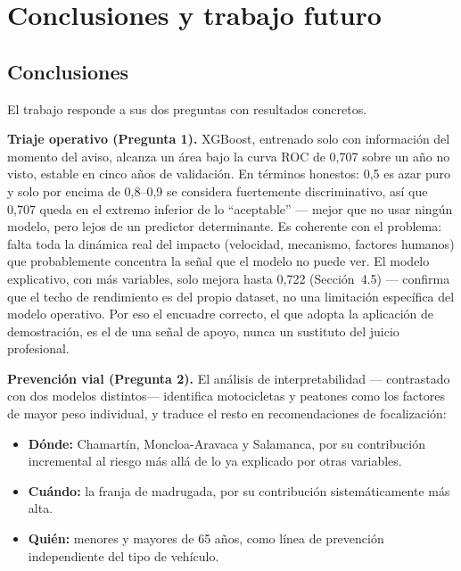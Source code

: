 \documentclass[11pt,a4paper]{article}
\begin{document}
\section{Conclusiones y trabajo futuro}

\subsection{Conclusiones}

El trabajo responde a sus dos preguntas con resultados concretos.

\textbf{Triaje operativo (Pregunta 1).} XGBoost, entrenado solo con información del momento del aviso, alcanza un área bajo la curva ROC de 0,707 sobre un año no visto, estable en cinco años de validación. En términos honestos: 0,5 es azar puro y solo por encima de 0,8--0,9 se considera fuertemente discriminativo, así que 0,707 queda en el extremo inferior de lo ``aceptable'' --- mejor que no usar ningún modelo, pero lejos de un predictor determinante. Es coherente con el problema: falta toda la dinámica real del impacto (velocidad, mecanismo, factores humanos) que probablemente concentra la señal que el modelo no puede ver. El modelo explicativo, con más variables, solo mejora hasta 0,722 (Sección~4.5) --- confirma que el techo de rendimiento es del propio dataset, no una limitación específica del modelo operativo. Por eso el encuadre correcto, el que adopta la aplicación de demostración, es el de una señal de apoyo, nunca un sustituto del juicio profesional.

\textbf{Prevención vial (Pregunta 2).} El análisis de interpretabilidad --- contrastado con dos modelos distintos--- identifica motocicletas y peatones como los factores de mayor peso individual, y traduce el resto en recomendaciones de focalización:

\begin{itemize}[nosep]
\item \textbf{Dónde:} Chamartín, Moncloa-Aravaca y Salamanca, por su contribución incremental al riesgo más allá de lo ya explicado por otras variables.
\item \textbf{Cuándo:} la franja de madrugada, por su contribución sistemáticamente más alta.
\item \textbf{Quién:} menores y mayores de 65 años, como línea de prevención independiente del tipo de vehículo.
\end{itemize}
\end{document}
